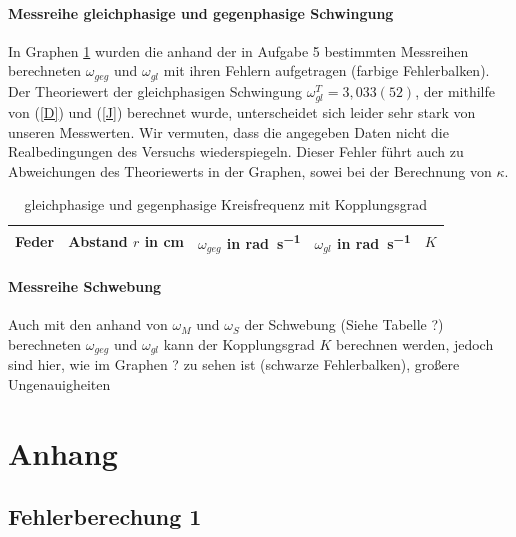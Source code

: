 \documentclass[11pt, a4paper]{article}
\begin{document}
    \paragraph{Messreihe gleichphasige und gegenphasige Schwingung}
    In Graphen \ref{mess1} wurden die anhand der in Aufgabe 5 bestimmten Messreihen
    berechneten $\omega_{geg}$ und $\omega_{gl}$ mit ihren Fehlern aufgetragen (farbige Fehlerbalken). Der Theoriewert der gleichphasigen
    Schwingung $\omega_{gl}^T = 3,033(52)$, der mithilfe von (\ref{D}) und (\ref{J}) berechnet wurde, 
    unterscheidet sich leider sehr stark von unseren Messwerten. Wir vermuten, dass die angegeben Daten nicht
    die Realbedingungen des Versuchs wiederspiegeln. Dieser Fehler führt auch zu Abweichungen des Theoriewerts
    in der Graphen, sowei bei der Berechnung von $\kappa$.


    
    \begin{table}[H]
        \label{mess1}
        \centering
        \begin{tabular}{c c c c c}
            Feder & Abstand $r$ in \si{\centi\metre} & $\omega_{geg}$ in \si{\radian\per\second} &
            $\omega_{gl}$ in \si{\radian\per\second} & $K$ \\ \hline
            
            
        \end{tabular}
        \caption{gleichphasige und gegenphasige Kreisfrequenz mit Kopplungsgrad}
    \end{table}

    \paragraph{Messreihe Schwebung}
    Auch mit den anhand von $\omega_M$ und $\omega_S$ der Schwebung (Siehe Tabelle ?)
    berechneten $\omega_{geg}$ und $\omega_{gl}$ kann der Kopplungsgrad $K$ berechnen werden,
    jedoch sind hier, wie im Graphen ? zu sehen ist (schwarze Fehlerbalken), großere Ungenauigheiten

    \section{Anhang}
    \subsection{Fehlerberechung 1}
    
\end{document}
